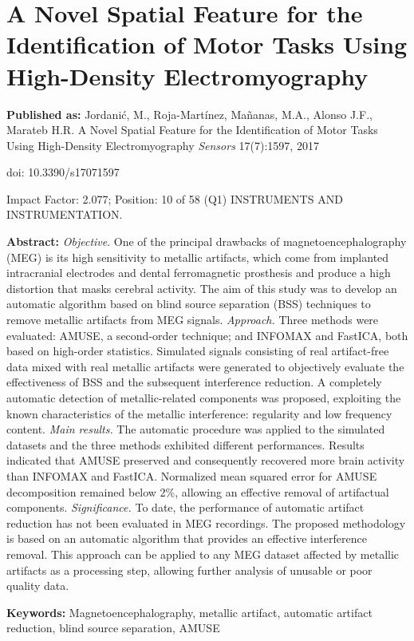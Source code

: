 \chapter{A Novel Spatial Feature for the Identification of Motor Tasks Using High-Density Electromyography}
\label{ch:4}
\textbf{Published as:} 
Jordanić, M., Roja-Martínez,  Ma\~nanas, M.A., Alonso J.F., Marateb H.R.
A Novel Spatial Feature for the Identification of Motor Tasks Using High-Density Electromyography 
\textit{Sensors} 17(7):1597, 2017

doi: 10.3390/s17071597

Impact Factor: 2.077; Position: 10 of 58 (Q1) INSTRUMENTS AND INSTRUMENTATION.


\textbf{Abstract:} \textit{Objective}. One of the principal drawbacks of magnetoencephalography (MEG) is its high sensitivity to metallic artifacts, which come from implanted intracranial electrodes and dental ferromagnetic prosthesis and produce a high distortion that masks cerebral activity. The aim of this study was to develop an automatic algorithm based on blind source separation (BSS) techniques to remove metallic artifacts from MEG signals. \textit{Approach.} Three methods were evaluated: AMUSE, a second-order technique; and INFOMAX and FastICA, both based on high-order statistics. Simulated signals consisting of real artifact-free data mixed with real metallic artifacts were generated to objectively evaluate the effectiveness of BSS and the subsequent interference reduction. A completely automatic detection of metallic-related components was proposed, exploiting the known characteristics of the metallic interference: regularity and low frequency content. \textit{Main results.} The automatic procedure was applied to the simulated datasets and the three methods exhibited different performances. Results indicated that AMUSE preserved and consequently recovered more brain activity than INFOMAX and FastICA. Normalized mean squared error for AMUSE decomposition remained below 2\%, allowing an effective removal of artifactual components. \textit{Significance.} To date, the performance of automatic artifact reduction has not been evaluated in MEG recordings. The proposed methodology is based on an automatic algorithm that provides an effective interference removal. This approach can be applied to any MEG dataset affected by metallic artifacts as a processing step, allowing further analysis of unusable or poor quality data.

\textbf{Keywords:} Magnetoencephalography, metallic artifact, automatic artifact reduction, blind source separation, AMUSE


